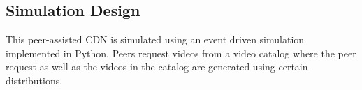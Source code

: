 \documentclass[10pt,final,journal,a4paper]{IEEEtran}
\begin{document}



\subsection{Simulation Design}\label{simulationdesign}

This peer-assisted CDN is simulated using an event driven simulation implemented in Python. 
Peers request videos from a video catalog where the peer request as well as the videos in the catalog are generated using certain distributions.

\end{document}
